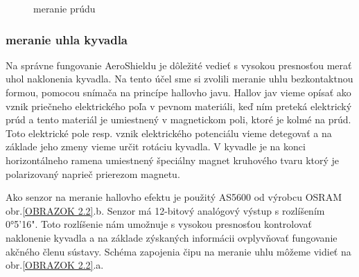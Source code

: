 \begin{figure}[!tbh]
\hfill
{}
\hfill
{}
\hfill
\caption{meranie prúdu}\label{OBRAZOK 2.3}
\end{figure}


\label{Hall}
\subsubsection{meranie uhla kyvadla}

Na správne fungovanie AeroShieldu je dôležité vedieť s vysokou presnosťou merať uhol naklonenia kyvadla. Na tento účel sme si zvolili meranie uhlu bezkontaktnou formou, pomocou snímača na princípe hallovho javu. Hallov jav vieme opísať ako vznik priečneho elektrického poľa v pevnom materiáli, keď ním preteká elektrický prúd a tento materiál je umiestnený v magnetickom poli, ktoré je kolmé na prúd\cite{Hall}. Toto elektrické pole resp. vznik elektrického potenciálu vieme detegovať a na základe jeho zmeny vieme určit rotáciu kyvadla. V kyvadle je na konci horizontálneho ramena umiestnený špeciálny magnet kruhového tvaru ktorý je polarizovaný naprieč prierezom magnetu.

Ako senzor na meranie hallovho efektu je použitý AS5600 od výrobcu OSRAM obr.\ref{OBRAZOK 2.2}.b. Senzor má 12-bitový analógový výstup s rozlíšením 0°5'16". Toto rozlíšenie nám umožnuje s vysokou presnosťou kontrolovať naklonenie kyvadla a na základe zýskaných informácii ovplyvňovať fungovanie akčného členu sústavy. Schéma zapojenia čipu na meranie uhlu môžeme vidieť na obr.\ref{OBRAZOK 2.2}.a.


